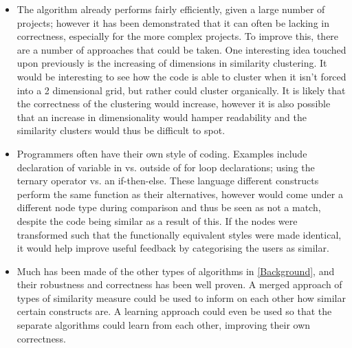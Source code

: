 \begin{itemize}
\item
The algorithm already performs fairly efficiently, given a large number of 
projects; however it has been demonstrated that it can often be lacking
in correctness, especially for the more complex projects. To improve this,
there are a number of approaches that could be taken. One interesting idea
touched upon previously is the increasing of dimensions in similarity clustering.
It would be interesting to see how the code is able to cluster when it isn't forced
into a 2 dimensional grid, but rather could cluster organically. It is likely
that the correctness of the clustering would increase, however it is also possible 
that an increase in dimensionality would hamper readability and the similarity
clusters would thus be difficult to spot.

\item
Programmers often have their own style of coding. Examples include
declaration of variable in vs. outside of for loop declarations;
using the ternary operator vs. an if-then-else. These language
different constructs perform the same function as their alternatives,
however would come under a different node type during comparison
and thus be seen as not a match, despite the code being similar as a result of
this. If the nodes were transformed such that the functionally equivalent
styles were made identical, it would help improve useful feedback by
categorising the users as similar.

\item
Much has been made of the other types of algorithms in \cref{Background}, and
their robustness and correctness has been well proven. A merged approach of types
of similarity measure could be used to inform on each other how similar certain
constructs are. A learning approach could even be used so that the separate algorithms
could learn from each other, improving their own correctness.
\end{itemize}
